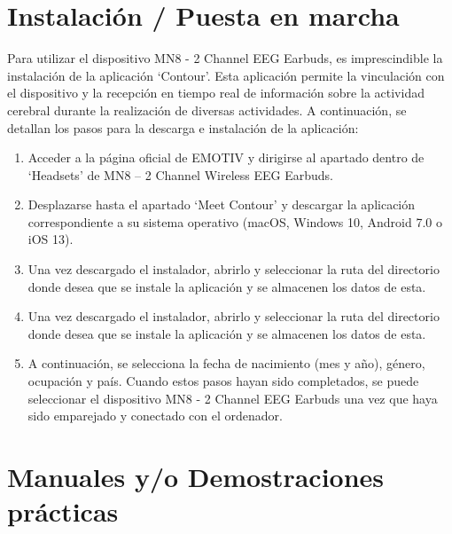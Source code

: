 \section{Instalación / Puesta en marcha}
Para utilizar el dispositivo MN8 - 2 Channel EEG Earbuds, es imprescindible la instalación de la aplicación ‘Contour’. Esta aplicación permite la vinculación con el dispositivo y la recepción en tiempo real de información sobre la actividad cerebral durante la realización de diversas actividades. A continuación, se detallan los pasos para la descarga e instalación de la aplicación:

\begin{enumerate}
    \item Acceder a la página oficial de EMOTIV y dirigirse al apartado dentro de ‘Headsets’ de MN8 – 2 Channel Wireless EEG Earbuds.
    \item Desplazarse hasta el apartado ‘Meet Contour’ y descargar la aplicación correspondiente a su sistema operativo (macOS, Windows 10, Android 7.0 o iOS 13).
    \item Una vez descargado el instalador, abrirlo y seleccionar la ruta del directorio donde desea que se instale la aplicación y se almacenen los datos de esta.
    \item Una vez descargado el instalador, abrirlo y seleccionar la ruta del directorio donde desea que se instale la aplicación y se almacenen los datos de esta.
    \item A continuación, se selecciona la fecha de nacimiento (mes y año), género, ocupación y país. Cuando estos pasos hayan sido completados, se puede seleccionar el dispositivo MN8 - 2 Channel EEG Earbuds una vez que haya sido emparejado y conectado con el ordenador.
\end{enumerate}



\section{Manuales y/o Demostraciones prácticas}
